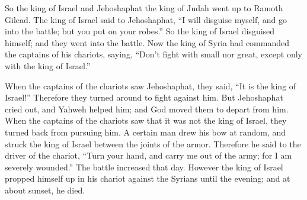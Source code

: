 {\par }{\PP {}So the king of Israel and Jehoshaphat the king of Judah went up to Ramoth Gilead.
The king of Israel said to Jehoshaphat, “I will disguise myself, and go into the battle; but you put on your robes.” So the king of Israel disguised himself; and they went into the battle.
Now the king of Syria had commanded the captains of his chariots, saying, “Don’t fight with small nor great, except only with the king of Israel.”
\par }{\PP {}When the captains of the chariots saw Jehoshaphat, they said, “It is the king of Israel!” Therefore they turned around to fight against him. But Jehoshaphat cried out, and Yahweh helped him; and God moved them to depart from him.
When the captains of the chariots saw that it was not the king of Israel, they turned back from pursuing him.
A certain man drew his bow at random, and struck the king of Israel between the joints of the armor. Therefore he said to the driver of the chariot, “Turn your hand, and carry me out of the army; for I am severely wounded.”
The battle increased that day. However the king of Israel propped himself up in his chariot against the Syrians until the evening; and at about sunset, he died.

}
